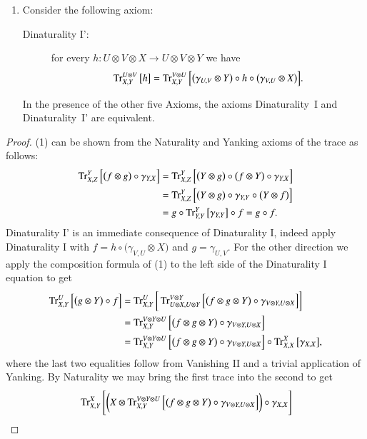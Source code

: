 \documentclass[12pt,oneside,article,draft]{memoir}
\begin{document}
{\begin{proposition}
\begin{enumerate}
 \[g\circ f=\Tr^Y_{X,Z}\Big[\big(f\otimes g\big)\circ\gamma_{Y,X}\Big].\]
 \item Consider the following axiom:
 \begin{description}
  \item [Dinaturality I':] for every $h\colon U\otimes V\otimes X\to U\otimes V\otimes Y$ we have
 \[\operatorname{Tr}^{U\otimes V}_{X,Y}\big[h\big]=\operatorname{Tr}^{V\otimes U}_{X,Y}\Big[\big(\gamma_{U,V}\otimes Y\big)\circ h\circ\big(\gamma_{V,U}\otimes X\big)\Big].\]
 \end{description}
 In the presence of the other five Axioms, the axioms Dinaturality~I and Dinaturality~I' are equivalent.
\end{enumerate}
\end{proposition}
\begin{proof}
 (1) can be shown from the Naturality and Yanking axioms of the trace as follows:
 \begin{align*}
  \operatorname{Tr}^Y_{X,Z}\Big[\big(f\otimes g\big)\circ\gamma_{Y,X}\Big]
  &=\operatorname{Tr}^Y_{X,Z}\Big[\big(Y\otimes g\big)\circ\big(f\otimes Y\big)\circ\gamma_{Y,X}\Big]\\
  &=\operatorname{Tr}^Y_{X,Z}\Big[\big(Y\otimes g\big)\circ\gamma_{Y,Y}\circ\big(Y\otimes f\big)\Big]\\
  &=g\circ\operatorname{Tr}^Y_{Y,Y}\big[\gamma_{Y,Y}\big]\circ f=g\circ f.
 \end{align*}
 Dinaturality I' is an immediate consequence of Dinaturality I, indeed apply Dinaturality I with $f=h\circ\big(\gamma_{V,U}\otimes X\big)$ and $g=\gamma_{U,V}$.  For the other direction we apply the composition formula of (1) to the left side of the Dinaturality I equation to get
 \begin{align*}
  \operatorname{Tr}^U_{X,Y}\Big[\big(g\otimes Y\big)\circ f\Big]
  &=\operatorname{Tr}^U_{X,Y}\bigg[\operatorname{Tr}^{V\otimes Y}_{U\otimes X,U\otimes Y}\Big[\big(f\otimes g\otimes Y\big)\circ\gamma_{V\otimes Y,U\otimes X}\Big]\bigg]\\
 &=\operatorname{Tr}^{V\otimes Y\otimes U}_{X,Y}\Big[\big(f\otimes g\otimes Y\big)\circ\gamma_{V\otimes Y,U\otimes X}\Big]\\
  &=\operatorname{Tr}^{V\otimes Y\otimes U}_{X,Y}\Big[\big(f\otimes g\otimes Y\big)\circ\gamma_{V\otimes Y,U\otimes X}\Big]\circ\operatorname{Tr}^X_{X,X}\big[\gamma_{X,X}\big],
 \end{align*}
 where the last two equalities follow from Vanishing II and a trivial application of Yanking.  
 By Naturality we may bring the first trace into the second to get
 \begin{align*}
  &\Tr^X_{X,Y}\Bigg[\bigg(X\otimes \Tr^{V\otimes Y\otimes U}_{X,Y}\Big[\big(f\otimes g\otimes Y\big)\circ\gamma_{V\otimes Y,U\otimes X}\Big]\bigg)\circ\gamma_{X,X}\Bigg]\\

\end{align*}
\end{proof}}
\end{document}
